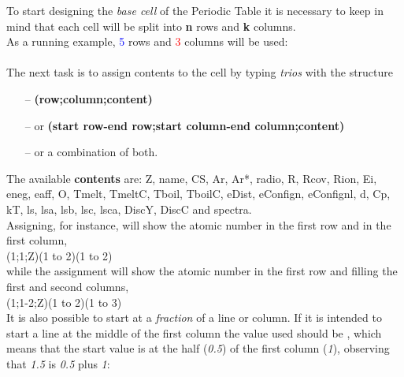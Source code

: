 %
\hypertarget{buildcells}{To start designing} the \textit{base cell} of the Periodic Table it is necessary to keep in mind that each cell will be split into \textbf{n} rows and \textbf{k} columns.
\\ [6pt]As a running example, \textcolor{blue}{5} rows and \textcolor{red}{3} columns will be used:
\\ [6pt]
\\ [10pt]The next task is to assign contents to the cell by typing \textit{trios} with the structure
\begin{itemize}
\item[--]\textbf{(row;column;content)}\item[--]or \textbf{(start row-end row;start column-end column;content)}\item[--]or a combination of both.
\end{itemize}
The available \textbf{contents} are: Z, name, CS, Ar, Ar*, radio, R, Rcov, Rion, Ei, eneg, eaff, O, Tmelt, TmeltC, Tboil, TboilC, eDist, eConfign, eConfignl, d, Cp, kT, ls, lsa, lsb, lsc, lsca, DiscY, DiscC and spectra.
\\ [16pt]Assigning, for instance,  will show the atomic number in the first row and in the first column,
\\ [6pt]\pgfPTMcelldesign(1;1;Z)(1 to 2)(1 to 2)
\\ [6pt]while the assignment  will show the atomic number in the first row and filling the first and second columns,
\\ [6pt]\pgfPTMcelldesign(1;1-2;Z)(1 to 2)(1 to 3)
\\ [10pt]It is also possible to start at a \textit{fraction} of a line or column. If it is intended to start a line at the middle of the first column the value used should be , which means that the start value is at the half (\textit{0.5}) of the first column (\textit{1}), observing that \textit{1.5} is \textit{0.5} plus \textit{1}:
